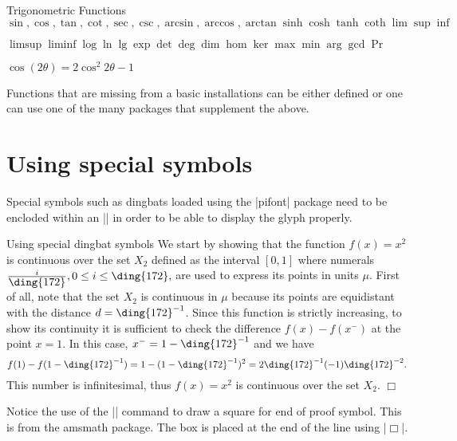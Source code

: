 \begin{texexample}{Trigonometric Functions}{}
\begin{math}
\sin, \cos, \tan, \cot, \sec, \csc, \arcsin, \arccos,
\arctan \sinh \cosh \tanh \coth \lim \sup \inf
\end{math}

\begin{math}
\limsup \liminf \log \ln \lg \exp \det \deg
\dim \hom \ker \max \min \arg \gcd \Pr
\end{math}

\begin{math}
\cos(2\theta) = 2 \cos^{2}2 \theta-1
\end{math}
\end{texexample}

Functions that are missing from a basic installations can be either defined or one can use one of the many packages that supplement the above.


\section{Using special symbols}

Special symbols such as dingbats loaded using the |pifont| package need to be encloded within an |\mbox| in order to be able to display the glyph properly.
\bigskip

\begin{texexample}{Using special dingbat symbols}{}
\label{e14}
 We start by showing that the function $f(x)=x^2$ is
continuous over the set $X_2$\label{p:X2} defined as the interval
$[0,1]$ where numerals $\frac{i}{\mbox{\ding{172}}}, 0 \le i \le
\mbox{\ding{172}},$ are used to express its points in units $\mu$.
First of all, note that the set $X_2$ is continuous in   $\mu$
because its points are equidistant with the distance
$d=\mbox{\ding{172}}^{-1}$. Since this function is strictly
increasing,  to show its continuity it is sufficient to check the
difference $f(x)-f(x^{-})$ at the point $x=1$. In this case,
$x^{-}=1-\mbox{\ding{172}}^{-1}$ and we have
\[
 f(1)-f(1-\mbox{\ding{172}}^{-1})=
 1-(1-\mbox{\ding{172}}^{-1})^2 =
 2\mbox{\ding{172}}^{-1}(-1)\mbox{\ding{172}}^{-2}.
\]
This number is infinitesimal, thus $f(x)=x^2$ is continuous over
the set $X_2$. \hfill $\Box$
\end{texexample}

Notice the use of the |\Box| command to draw a square for  end of proof symbol. This is from the amsmath package. The box is placed at the end of the line using |\hfill $\Box$|.



